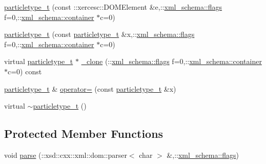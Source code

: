 \begin{DoxyCompactItemize}
\hyperlink{classparticletype__t_a580bd1128ee7796c9b2ec9f463f91b5b}{particletype\+\_\+t} (const \+::xercesc\+::\+D\+O\+M\+Element \&e,\+::\hyperlink{namespacexml__schema_a0612287d030cb2732d31a45b258fdc87}{xml\+\_\+schema\+::flags} f=0,\+::\hyperlink{namespacexml__schema_ada9aa30dc722e93ee2ed7243085402a5}{xml\+\_\+schema\+::container} $\ast$c=0)
\item 
\hyperlink{classparticletype__t_a86329e35b2ba5ca62f63ffa0b5743dc2}{particletype\+\_\+t} (const \hyperlink{classparticletype__t}{particletype\+\_\+t} \&x,\+::\hyperlink{namespacexml__schema_a0612287d030cb2732d31a45b258fdc87}{xml\+\_\+schema\+::flags} f=0,\+::\hyperlink{namespacexml__schema_ada9aa30dc722e93ee2ed7243085402a5}{xml\+\_\+schema\+::container} $\ast$c=0)
\item 
virtual \hyperlink{classparticletype__t}{particletype\+\_\+t} $\ast$ \hyperlink{classparticletype__t_a17d289547d6936235e99c04a08baa9ad}{\+\_\+clone} (\+::\hyperlink{namespacexml__schema_a0612287d030cb2732d31a45b258fdc87}{xml\+\_\+schema\+::flags} f=0,\+::\hyperlink{namespacexml__schema_ada9aa30dc722e93ee2ed7243085402a5}{xml\+\_\+schema\+::container} $\ast$c=0) const 
\item 
\hyperlink{classparticletype__t}{particletype\+\_\+t} \& \hyperlink{classparticletype__t_a34e937edde9d73aa411c175182e6006a}{operator=} (const \hyperlink{classparticletype__t}{particletype\+\_\+t} \&x)
\item 
virtual \hyperlink{classparticletype__t_aa5a6a6252899d8263b91b4e098969c2d}{$\sim$particletype\+\_\+t} ()
\end{DoxyCompactItemize}
\subsection*{Protected Member Functions}
\begin{DoxyCompactItemize}
\item 
void \hyperlink{classparticletype__t_a7a353632a13af1c190a9fb5cafa6bd36}{parse} (\+::xsd\+::cxx\+::xml\+::dom\+::parser$<$ char $>$ \&,\+::\hyperlink{namespacexml__schema_a0612287d030cb2732d31a45b258fdc87}{xml\+\_\+schema\+::flags})
\end{DoxyCompactItemize}
